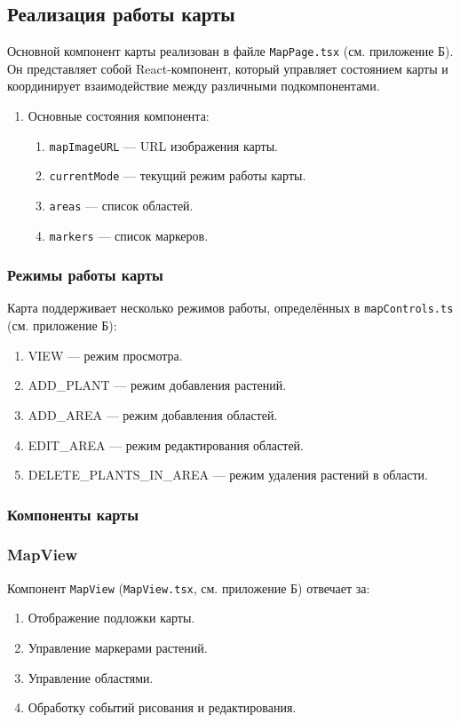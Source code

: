 \subsection{Реализация работы карты}

Основной компонент карты реализован в файле \texttt{MapPage.tsx} (см. приложение Б). Он представляет собой React-компонент, который управляет состоянием карты и координирует взаимодействие между различными подкомпонентами.

\begin{enumerate}
    \item Основные состояния компонента:
    \begin{enumerate}
        \item \texttt{mapImageURL} --- URL изображения карты.
        \item \texttt{currentMode} --- текущий режим работы карты.
        \item \texttt{areas} --- список областей.
        \item \texttt{markers} --- список маркеров.
    \end{enumerate}
\end{enumerate}

\subsubsection{Режимы работы карты}

Карта поддерживает несколько режимов работы, определённых в \texttt{mapControls.ts} (см. приложение Б):

\begin{enumerate}
    \item VIEW --- режим просмотра.
    \item ADD\_PLANT --- режим добавления растений.
    \item ADD\_AREA --- режим добавления областей.
    \item EDIT\_AREA --- режим редактирования областей.
    \item DELETE\_PLANTS\_IN\_AREA --- режим удаления растений в области.
\end{enumerate}

\subsubsection{Компоненты карты}

\subsubsection{MapView}
Компонент \texttt{MapView} (\texttt{MapView.tsx}, см. приложение Б) отвечает за:
\begin{enumerate}
    \item Отображение подложки карты.
    \item Управление маркерами растений.
    \item Управление областями.
    \item Обработку событий рисования и редактирования.
\end{enumerate}

